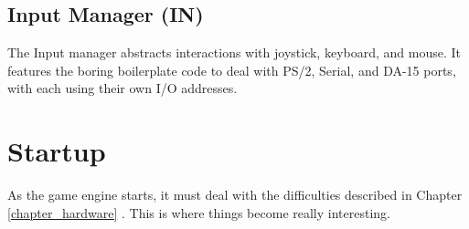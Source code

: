 \documentclass[book.tex]{subfiles}
\begin{document}
\subsection{Input Manager (IN)}
The Input manager abstracts interactions with joystick, keyboard, and mouse. It features the boring boilerplate code to deal with PS/2, Serial, and DA-15 ports, with each using their own I/O addresses.
















\section{Startup}
As the game engine starts, it must deal with the difficulties described in Chapter \ref{chapter_hardware} . This is where things become really interesting.
\end{document}
